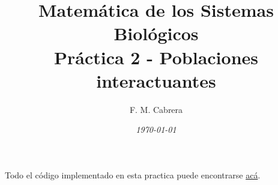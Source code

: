 \documentclass[11pt,a4paper]{article}
\title{\textbf{Matemática de los Sistemas Biológicos \\ Práctica 2 - Poblaciones interactuantes}}
\author{
{F. M. Cabrera}
}
\date{\textit{\today}}
\begin{document}
\maketitle



\setcounter{page}{1}




Todo el código implementado en esta practica puede encontrarse \href{https://github.com/cabre94/MSB_IB}{acá}.











\end{document}
